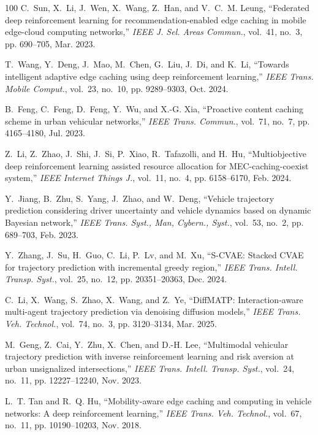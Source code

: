 \documentclass[journal]{IEEEtran}
\begin{document}
\begin{thebibliography}{100}
C.~Sun, X.~Li, J.~Wen, X.~Wang, Z.~Han, and V.~C.~M. Leung, ``Federated deep reinforcement learning for recommendation-enabled edge caching in mobile edge-cloud computing networks,'' \textit{IEEE J. Sel. Areas Commun.}, vol.~41, no.~3, pp. 690--705, Mar. 2023.

T.~Wang, Y.~Deng, J.~Mao, M.~Chen, G.~Liu, J.~Di, and K.~Li, ``Towards intelligent adaptive edge caching using deep reinforcement learning,'' \textit{IEEE Trans. Mobile Comput.}, vol.~23, no.~10, pp. 9289--9303, Oct. 2024.

B.~Feng, C.~Feng, D.~Feng, Y.~Wu, and X.-G. Xia, ``Proactive content caching scheme in urban vehicular networks,'' \textit{IEEE Trans. Commun.}, vol.~71, no.~7, pp. 4165--4180, Jul. 2023.

Z.~Li, Z.~Zhao, J.~Shi, J.~Si, P.~Xiao, R.~Tafazolli, and H.~Hu, ``Multiobjective deep reinforcement learning assisted resource allocation for MEC-caching-coexist system,'' \textit{IEEE Internet Things J.}, vol.~11, no.~4, pp. 6158--6170, Feb. 2024.

Y.~Jiang, B.~Zhu, S.~Yang, J.~Zhao, and W.~Deng, ``Vehicle trajectory prediction considering driver uncertainty and vehicle dynamics based on dynamic Bayesian network,'' \textit{IEEE Trans. Syst., Man, Cybern., Syst.}, vol.~53, no.~2, pp. 689--703, Feb. 2023.

Y.~Zhang, J.~Su, H.~Guo, C.~Li, P.~Lv, and M.~Xu, ``S-CVAE: Stacked CVAE for trajectory prediction with incremental greedy region,'' \textit{IEEE Trans. Intell. Transp. Syst.}, vol.~25, no.~12, pp. 20351--20363, Dec. 2024.

C.~Li, X.~Wang, S.~Zhao, X.~Wang, and Z.~Ye, ``DiffMATP: Interaction-aware multi-agent trajectory prediction via denoising diffusion models,'' \textit{IEEE Trans. Veh. Technol.}, vol.~74, no.~3, pp. 3120--3134, Mar. 2025.

M.~Geng, Z.~Cai, Y.~Zhu, X.~Chen, and D.-H. Lee, ``Multimodal vehicular trajectory prediction with inverse reinforcement learning and risk aversion at urban unsignalized intersections,'' \textit{IEEE Trans. Intell. Transp. Syst.}, vol.~24, no.~11, pp. 12227--12240, Nov. 2023.

L.~T. Tan and R.~Q. Hu, ``Mobility-aware edge caching and computing in vehicle networks: A deep reinforcement learning,'' \textit{IEEE Trans. Veh. Technol.}, vol.~67, no.~11, pp. 10190--10203, Nov. 2018.


\end{thebibliography}
\end{document}
